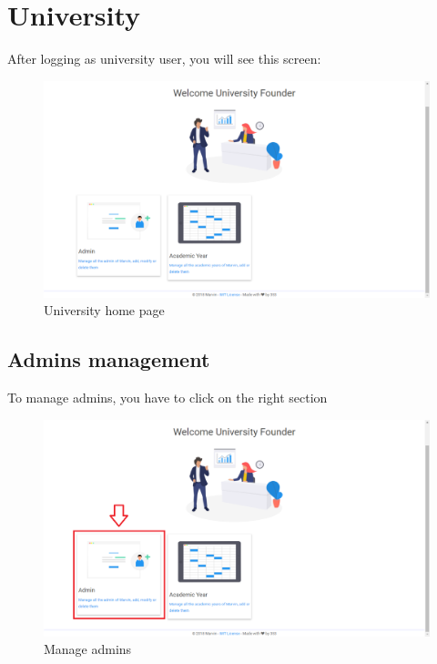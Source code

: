 \documentclass[ManualeUtente]{subfiles}
\begin{document}
	
	\chapter{University}
	After logging as university user, you will see this screen:
	\begin{figure}[H]
		\centering
		\includegraphics[width=0.7\linewidth]{./image/University}
		\caption[University]{University home page}
		\label{fig:university1}
	\end{figure}
	\newpage
	\section{Admins management}
	To manage admins, you have to click on the right section\\
	\begin{figure}[H]
		\centering
		\includegraphics[width=0.7\linewidth]{./image/UniAdmin}
		\caption[Manage admin]{Manage admins}
		\label{fig:uniadmin}
	\end{figure}
	
\end{document}
